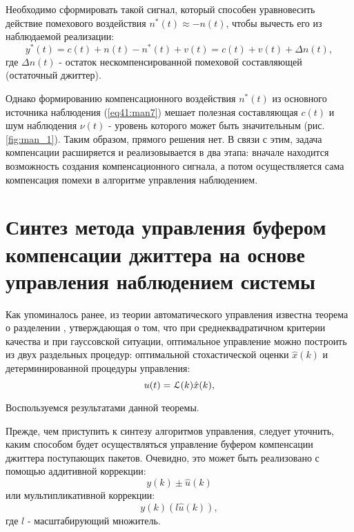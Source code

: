Необходимо сформировать такой сигнал, который способен уравновесить действие помехового воздействия $n^*(t)\approx-n(t)$, чтобы вычесть его из наблюдаемой реализации:
\begin{equation}\label{eq41:man8}
y^*(t)=c(t)+n(t)-n^*(t)+v(t)=c(t)+v(t)+\Delta n(t),
\end{equation}
\noindent где $\Delta n(t)$ - остаток нескомпенсированной помеховой составляющей (остаточный джиттер).

Однако формированию компенсационного воздействия $n^*(t)$ из основного источника наблюдения (\ref{eq41:man7}) мешает полезная составляющая $c(t)$ и шум наблюдения $\nu (t)$ - уровень которого может быть значительным (рис. \ref{fig:man_1}).
Таким образом, прямого решения нет.
В связи с этим, задача компенсации расширяется и реализовывается в два этапа: вначале находится возможность создания компенсационного сигнала, а потом осуществляется сама компенсация помехи в алгоритме управления наблюдением.


\section{Синтез метода управления буфером компенсации джиттера на основе управления наблюдением системы}

Как упоминалось ранее, из теории автоматического управления известна теорема о разделении \cite{seij, red}, утверждающая о том, что при среднеквадратичном критерии качества и
при гауссовской ситуации, оптимальное управление можно построить из двух раздельных процедур: оптимальной стохастической оценки $\hat x (k)$  и детерминированной процедуры управления:
\begin{equation}\label{eq41:man9}
u(t)=\EuScript{L}(k)\hat x (k),
\end{equation}

Воспользуемся результатами данной теоремы.

Прежде, чем приступить к синтезу алгоритмов управления, следует уточнить, каким способом будет осуществляться управление буфером компенсации джиттера поступающих пакетов. 
Очевидно, это может быть реализовано с помощью аддитивной коррекции:
\begin{equation}\label{eq41:man10}
y(k)\pm\hat u(k)
\end{equation}
или мультипликативной коррекции:
\begin{equation}\label{eq41:man11}
y(k)(l\hat u(k)),
\end{equation}
\noindent где $l$ - масштабирующий множитель.

